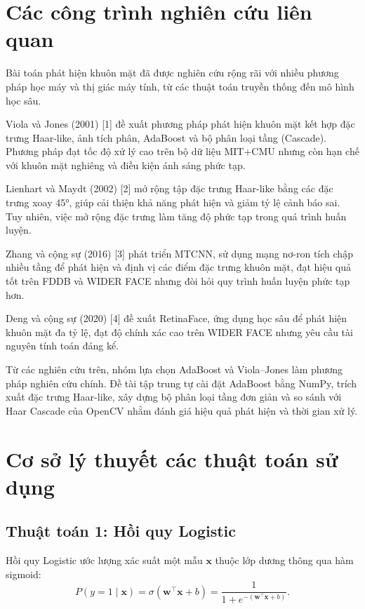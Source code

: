 \documentclass[12pt,a4paper,oneside]{report}
\begin{document}
\section{Các công trình nghiên cứu liên quan}
{Bài toán phát hiện khuôn mặt đã được nghiên cứu rộng rãi với nhiều phương pháp học máy và thị giác máy tính, từ các thuật toán truyền thống đến mô hình học sâu.

Viola và Jones (2001) [1] đề xuất phương pháp phát hiện khuôn mặt kết hợp đặc trưng Haar-like, ảnh tích phân, AdaBoost và bộ phân loại tầng (Cascade). Phương pháp đạt tốc độ xử lý cao trên bộ dữ liệu MIT+CMU nhưng còn hạn chế với khuôn mặt nghiêng và điều kiện ánh sáng phức tạp.

Lienhart và Maydt (2002) [2] mở rộng tập đặc trưng Haar-like bằng các đặc trưng xoay 45°, giúp cải thiện khả năng phát hiện và giảm tỷ lệ cảnh báo sai. Tuy nhiên, việc mở rộng đặc trưng làm tăng độ phức tạp trong quá trình huấn luyện.

Zhang và cộng sự (2016) [3] phát triển MTCNN, sử dụng mạng nơ-ron tích chập nhiều tầng để phát hiện và định vị các điểm đặc trưng khuôn mặt, đạt hiệu quả tốt trên FDDB và WIDER FACE nhưng đòi hỏi quy trình huấn luyện phức tạp hơn.

Deng và cộng sự (2020) [4] đề xuất RetinaFace, ứng dụng học sâu để phát hiện khuôn mặt đa tỷ lệ, đạt độ chính xác cao trên WIDER FACE nhưng yêu cầu tài nguyên tính toán đáng kể.

Từ các nghiên cứu trên, nhóm lựa chọn AdaBoost và Viola–Jones làm phương pháp nghiên cứu chính. Đề tài tập trung tự cài đặt AdaBoost bằng NumPy, trích xuất đặc trưng Haar-like, xây dựng bộ phân loại tầng đơn giản và so sánh với Haar Cascade của OpenCV nhằm đánh giá hiệu quả phát hiện và thời gian xử lý.}

\section{Cơ sở lý thuyết các thuật toán sử dụng}
\subsection{Thuật toán 1: Hồi quy Logistic}
Hồi quy Logistic ước lượng xác suất một mẫu $\mathbf{x}$ thuộc lớp dương
thông qua hàm sigmoid:
\begin{equation}
  P(y=1 \mid \mathbf{x}) = \sigma(\mathbf{w}^{\top}\mathbf{x}+b)
  = \frac{1}{1+e^{-(\mathbf{w}^{\top}\mathbf{x}+b)}}.
  \label{eq:sigmoid}
\end{equation}
\end{document}

